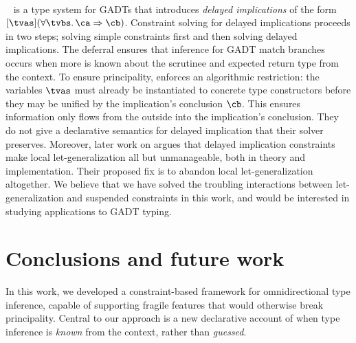 \documentclass[acmsmall,screen,nonacm,review]{acmart}
\begin{document}

\paragraph{\OutsideIn}

\OutsideIn~\citep*{conf/icfp/SchrijversJSV09} is a type system for GADTs that
introduces \emph{delayed implications} of the form $\where{\tvs}(\all \tvbs \ca
\Rightarrow \cb)$. Constraint solving for delayed implications proceeds in two
steps; solving simple constraints first and then solving delayed implications.
The deferral ensures that inference for GADT match branches occurs when more is
known about the scrutinee and expected return type from the context.
%
To ensure principality, \OutsideIn enforces an algorithmic
restriction: the variables $\tvs$ must already be instantiated to
concrete type constructors before they may be unified by the
implication's conclusion $\cb$. This ensures information only flows
from the outside into the implication's conclusion. They do not give
a declarative semantics for delayed implication that their solver
preserves. Moreover, later work on \OutsideIn argues
\citep*{Vytiniotis-Peyton-Jones-Schrijvers-Sulzmann/outsidein@jfp2011}
that delayed implication constraints make local let-generalization all
but unmanageable, both in theory and implementation. Their proposed fix
is to abandon local let-generalization altogether. We believe that we
have solved the troubling interactions between let-generalization and
suspended constraints in this work, and would be interested in
studying applications to GADT typing.

\section{Conclusions and future work}
\label{sec:discussion}
\label{sec:future-work}

In this work, we developed a constraint-based framework for omnidirectional
type inference, capable of supporting fragile features that would otherwise
break principality.
%
Central to our approach is a new declarative account of when type inference is
\emph{known} from the context, rather than \emph{guessed}.
\end{document}
